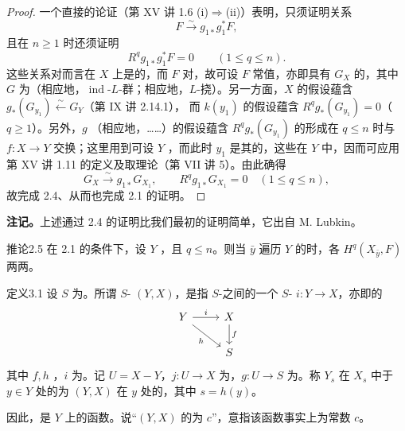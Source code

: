\begin{proof}
一个直接的论证（第 XV 讲 1.6 (i)$\Rightarrow$(ii)）表明，只须证明关系
\[
F\xrightarrow{\sim}g_{1*}g_1^*F,
\]
且在 $n\geq1$ 时还须证明
\[
R^qg_{1*}g_1^*F=0\qquad(1\leq q\leq n).
\]
这些关系对而言在 $X$ 上是的，而 $F$ 对，故可设 $F$ 常值，亦即具有 $G_X$ 的，其中 $G$ 为（相应地，$\operatorname{ind}$-$L$-群；相应地，$L$-挠）。另一方面，$X$ 的假设蕴含 $g_*(G_{y_1})\xleftarrow{\sim}G_Y$（第 IX 讲 2.14.1），
而 $k(y_1)$ 的假设蕴含 $R^qg_*(G_{y_1})=0$（$q\geq1$）。另外，$g$ （相应地，……）的假设蕴含 $R^qg_*(G_{y_1})$ 的形成在 $q\leq n$ 时与 $f:X\to Y$ 交换；这里用到可设 $Y$ ，而此时 $y_1$ 是其的，这些在 $Y$ 中，因而可应用第 XV 讲 1.11 的定义及取理论（第 VII 讲 5）。由此确得
\[
G_X\xrightarrow{\sim}g_{1*}G_{X_1},\qquad R^qg_{1*}G_{X_1}=0\quad(1\leq q\leq n),
\]
故完成 2.4、从而也完成 2.1 的证明。
\end{proof}
\textbf{注记。}上述通过 2.4 的证明比我们最初的证明简单，它出自 M. Lubkin。
\begin{SGAresult}{推论}{2.5}
在 2.1 的条件下，设 $Y$ ，且 $q\leq n$。则当 $\bar y$ 遍历 $Y$ 的时，各 $H^q(X_{\bar y},F)$ 两两。
\end{SGAresult}
\begin{SGAresult}{定义}{3.1}
设 $S$ 为。所谓 $S$- $(Y,X)$，是指 $S$-之间的一个 $S$- $i:Y\to X$，亦即的
\[
\begin{tikzcd}
Y\arrow[r,"i"]\arrow[dr,"h"']&X\arrow[d,"f"]\\&S
\end{tikzcd}
\]
其中 $f,h$ ，$i$ 为。记 $U=X-Y$，$j:U\to X$ 为，$g:U\to S$ 为。称 $Y_s$ 在 $X_s$ 中于 $y\in Y$ 处的为 $(Y,X)$ 在 $y$ 处的，其中 $s=h(y)$。
\end{SGAresult}
因此，是 $Y$ 上的函数。说“$(Y,X)$ 的为 $c$”，意指该函数事实上为常数 $c$。

